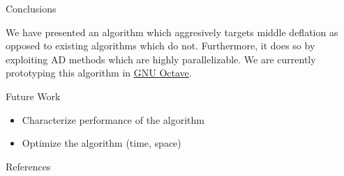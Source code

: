 \documentclass[final]{beamer}
\newlength{\onecolwid}
\begin{document}
\begin{frame}[t]
\begin{columns}[t]
\begin{column}{\onecolwid} %


\begin{block}{Conclusions}

We have presented an algorithm which aggresively targets middle deflation as
opposed to existing algorithms which do not. Furthermore, it does so by
exploiting AD methods which are highly parallelizable. We are currently
prototyping this algorithm in \href{http://octave.org/}{GNU Octave}.

\end{block}


\begin{block}{Future Work}

\begin{itemize}
  \item Characterize performance of the algorithm
  \item Optimize the algorithm (time, space)
\end{itemize}


\end{block}


\begin{block}{References}

\small{
\vspace{0.75in}}

\end{block}




\end{column}
\end{columns}
\end{frame}
\end{document}
